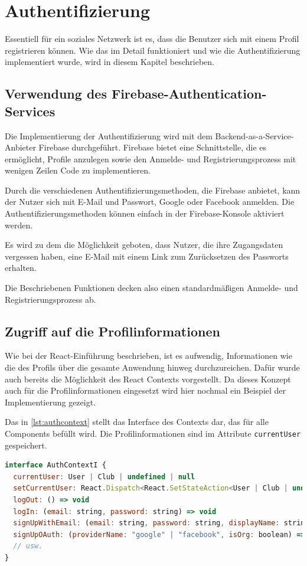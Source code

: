 \section{Authentifizierung}
\label{sec:authentifizierung}

Essentiell für ein soziales Netzwerk ist es, dass die Benutzer sich mit einem Profil registrieren können. Wie das im Detail funktioniert und wie die Authentifizierung implementiert wurde, wird in diesem Kapitel beschrieben.

\subsection{Verwendung des \glqq Firebase-Authentication\grqq-Services}
\label{sec:firebase_authentifizierung}
Die Implementierung der Authentifizierung wird mit dem Backend-as-a-Service-Anbieter Firebase durchgeführt. Firebase bietet eine Schnittstelle, die es ermöglicht, Profile anzulegen sowie den Anmelde- und Registrierungsprozess mit wenigen Zeilen Code zu implementieren.

Durch die verschiedenen Authentifizierungsmethoden, die Firebase anbietet, kann der Nutzer sich mit E-Mail und Passwort, Google oder Facebook anmelden. Die Authentifizierungsmethoden können einfach in der Firebase-Konsole aktiviert werden.

Es wird zu dem die Möglichkeit geboten, dass Nutzer, die ihre Zugangsdaten vergessen haben, eine E-Mail mit einem Link zum Zurücksetzen des Passworts erhalten.

Die Beschriebenen Funktionen decken also einen standardmäßigen Anmelde- und Registrierungsprozess ab.

\subsection{Zugriff auf die Profilinformationen}
\label{sec:zugriff_profilinformationen}
Wie bei der React-Einführung beschrieben, ist es aufwendig, Informationen wie die des Profils über die gesamte Anwendung hinweg durchzureichen. Dafür wurde auch bereits die Möglichkeit des React Contexts vorgestellt. Da dieses Konzept auch für die Profilinformationen eingesetzt wird hier nochmal ein Beispiel der Implementierung gezeigt.

Das in \autoref{lst:authcontext} stellt das Interface des Contexts dar, das für alle Components befüllt wird. Die Profilinformationen sind im Attribute \texttt{currentUser} gespeichert.

\begin{lstlisting}[language=JavaScript, caption=Auszug aus dem Interface des Authentifizierungscontexts, label={lst:authcontext}]
interface AuthContextI {
  currentUser: User | Club | undefined | null
  setCurrentUser: React.Dispatch<React.SetStateAction<User | Club | undefined | null>>
  logOut: () => void
  logIn: (email: string, password: string) => void
  signUpWithEmail: (email: string, password: string, displayName: string, isOrg: boolean) => Promise<void>
  signUpOAuth: (providerName: "google" | "facebook", isOrg: boolean) => void
  // usw.
}
\end{lstlisting}

